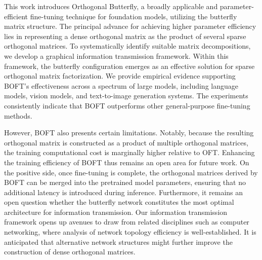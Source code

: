 This work introduces Orthogonal Butterfly, a broadly applicable and parameter-efficient fine-tuning technique for foundation models, utilizing the butterfly matrix structure. The principal advance for achieving higher parameter efficiency lies in representing a dense orthogonal matrix as the product of several sparse orthogonal matrices. To systematically identify suitable matrix decompositions, we develop a graphical information transmission framework. Within this framework, the butterfly configuration emerges as an effective solution for sparse orthogonal matrix factorization. We provide empirical evidence supporting BOFT’s effectiveness across a spectrum of large models, including language models, vision models, and text-to-image generation systems. The experiments consistently indicate that BOFT outperforms other general-purpose fine-tuning methods.

However, BOFT also presents certain limitations. Notably, because the resulting orthogonal matrix is constructed as a product of multiple orthogonal matrices, the training computational cost is marginally higher relative to OFT. Enhancing the training efficiency of BOFT thus remains an open area for future work. On the positive side, once fine-tuning is complete, the orthogonal matrices derived by BOFT can be merged into the pretrained model parameters, ensuring that no additional latency is introduced during inference. Furthermore, it remains an open question whether the butterfly network constitutes the most optimal architecture for information transmission. Our information transmission framework opens up avenues to draw from related disciplines such as computer networking, where analysis of network topology efficiency is well-established. It is anticipated that alternative network structures might further improve the construction of dense orthogonal matrices.